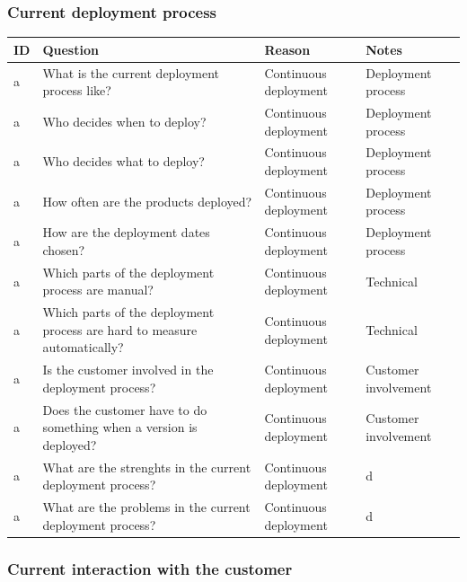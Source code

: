 \documentclass[english]{tktltiki2}
\theoremstyle{definition}
\theoremstyle{remark}
\begin{document}
\subsubsection{Current deployment process}

\begin{center}
    \begin{tabular}{ | l | l | l | p{5cm} |}
    \hline
    ID & Question & Reason & Notes \\ \hline
    a & What is the current deployment process like? & Continuous deployment & Deployment process \\ \hline
    a & Who decides when to deploy? & Continuous deployment & Deployment process \\ \hline
    a & Who decides what to deploy? & Continuous deployment & Deployment process \\ \hline
    a & How often are the products deployed? & Continuous deployment & Deployment process \\ \hline
    a & How are the deployment dates chosen? & Continuous deployment & Deployment process \\ \hline

    a & Which parts of the deployment process are manual? & Continuous deployment & Technical \\ \hline
    a & Which parts of the deployment process are hard to measure automatically? & Continuous deployment & Technical \\ \hline

    a & Is the customer involved in the deployment process? & Continuous deployment & Customer involvement \\ \hline
    a & Does the customer have to do something when a version is deployed? & Continuous deployment & Customer involvement \\ \hline

    a & What are the strenghts in the current deployment process? & Continuous deployment & d \\ \hline
    a & What are the problems in the current deployment process? & Continuous deployment & d \\ \hline
    \hline
    \end{tabular}
\end{center}

\subsubsection{Current interaction with the customer}
\end{document}
